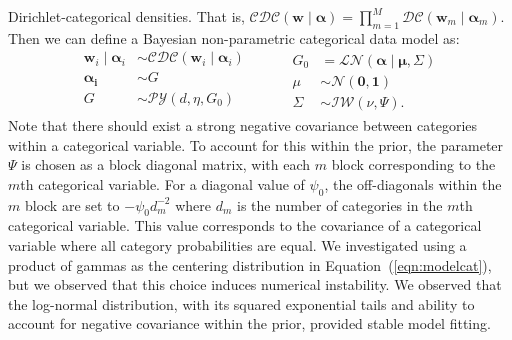     Dirichlet-categorical densities.  That is, 
    $\mathcal{CDC}(\bm{w}\mid\bm{\alpha}) = 
        \prod_{m = 1}^M\mathcal{DC}(\bm{w}_m\mid\bm{\alpha}_m)$.
    Then we can define a Bayesian non-parametric categorical data model as:
    \begin{equation}
      \label{eqn:modelcat}
      \begin{aligned}
      \bm{w}_i \mid \bm{\alpha}_i &\sim 
        \mathcal{CDC}\left(\bm{w}_i\mid\bm{\alpha}_i\right)\\
      \bm{\alpha_i} &\sim G\\
      G &\sim \mathcal{PY}\left(d, \eta, G_0\right)\\
      \end{aligned}
      ~\hspace{1cm}
      \begin{aligned}
      G_0 &= \mathcal{LN}\left(\bm{\alpha}\mid\bm{\mu},\Sigma\right)\\
      \mu &\sim \mathcal{N}\left(\bm{0},\bm{1}\right)\\
      \Sigma &\sim \mathcal{IW}\left(\nu, \Psi\right).
      \end{aligned}
    \end{equation}
    Note that there should exist a strong negative covariance between categories 
    within a categorical variable.  To account for this within the prior, the 
    parameter $\Psi$ is chosen as a block diagonal matrix, with each $m$ block 
    corresponding to the $m$th categorical variable.  For a diagonal value of 
    $\psi_0$, the off-diagonals within the $m$ block are set to $-\psi_0 d_m^{-2}$ 
    where $d_m$ is the number of categories in the $m$th categorical variable.
    This value corresponds to the covariance of a categorical variable where all 
    category probabilities are equal.
    We investigated using a product of gammas as the centering distribution in
    Equation~(\ref{eqn:modelcat}), but we observed that this choice induces
    numerical instability.  We observed that the log-normal distribution, with
    its squared exponential tails and ability to account for negative covariance
    within the prior, provided stable model fitting.

